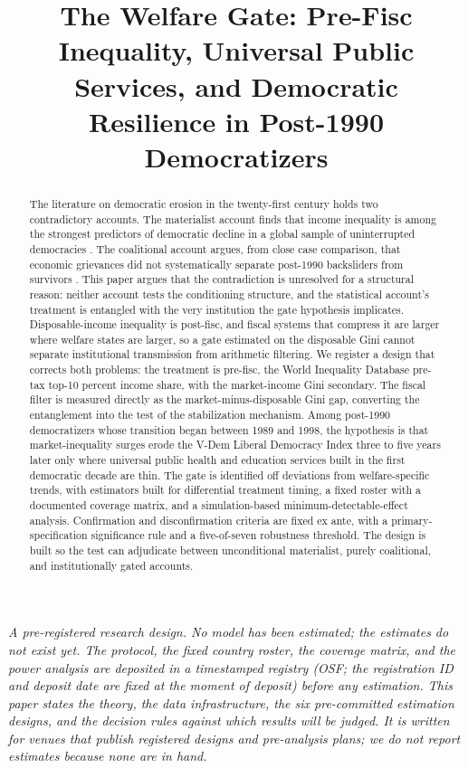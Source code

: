 \documentclass[11pt,letterpaper]{article}
\title{The Welfare Gate: Pre-Fisc Inequality, Universal Public Services, and Democratic Resilience in Post-1990 Democratizers}
\author{}
\date{}
\begin{document}
\maketitle

\noindent\emph{A pre-registered research design. No model has been estimated; the estimates do not exist yet. The protocol, the fixed country roster, the coverage matrix, and the power analysis are deposited in a timestamped registry (OSF; the registration ID and deposit date are fixed at the moment of deposit) before any estimation. This paper states the theory, the data infrastructure, the six pre-committed estimation designs, and the decision rules against which results will be judged. It is written for venues that publish registered designs and pre-analysis plans; we do not report estimates because none are in hand.}

\vspace{1.5em}

\begin{abstract}
The literature on democratic erosion in the twenty-first century holds two contradictory accounts. The materialist account finds that income inequality is among the strongest predictors of democratic decline in a global sample of uninterrupted democracies \citep{RauStokes2025}. The coalitional account argues, from close case comparison, that economic grievances did not systematically separate post-1990 backsliders from survivors \citep{HaggardKaufman2021}. This paper argues that the contradiction is unresolved for a structural reason: neither account tests the conditioning structure, and the statistical account's treatment is entangled with the very institution the gate hypothesis implicates. Disposable-income inequality is post-fisc, and fiscal systems that compress it are larger where welfare states are larger, so a gate estimated on the disposable Gini cannot separate institutional transmission from arithmetic filtering. We register a design that corrects both problems: the treatment is pre-fisc, the World Inequality Database pre-tax top-10 percent income share, with the market-income Gini secondary. The fiscal filter is measured directly as the market-minus-disposable Gini gap, converting the entanglement into the test of the stabilization mechanism. Among post-1990 democratizers whose transition began between 1989 and 1998, the hypothesis is that market-inequality surges erode the V-Dem Liberal Democracy Index three to five years later only where universal public health and education services built in the first democratic decade are thin. The gate is identified off deviations from welfare-specific trends, with estimators built for differential treatment timing, a fixed roster with a documented coverage matrix, and a simulation-based minimum-detectable-effect analysis. Confirmation and disconfirmation criteria are fixed ex ante, with a primary-specification significance rule and a five-of-seven robustness threshold. The design is built so the test can adjudicate between unconditional materialist, purely coalitional, and institutionally gated accounts.
\end{abstract}
\end{document}
